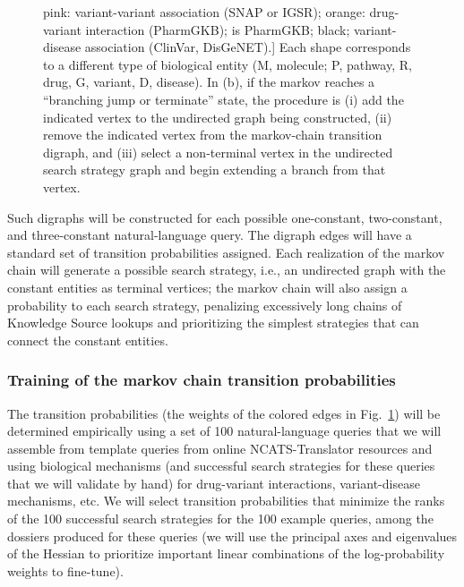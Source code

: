 \documentclass[11pt,notitlepage]{article}
\begin{document}
\begin{figure}[h!]
{      pink: variant-variant association (SNAP or IGSR); orange: drug-variant
      interaction (PharmGKB); is PharmGKB; black; variant-disease association
      (ClinVar, DisGeNET).] Each shape corresponds to a different type of
    biological entity (M, molecule; P, pathway, R, drug, G, variant, D,
    disease). In (b), if the markov reaches a ``branching jump or terminate''
    state, the procedure is (i) add the indicated vertex to the undirected graph
    being constructed, (ii) remove the indicated vertex from the markov-chain
    transition digraph, and (iii) select a non-terminal vertex in the undirected
    search strategy graph and begin extending a branch from that vertex.}
  \label{fig:mp}    
\end{figure}
Such digraphs will be constructed for each possible one-constant, two-constant,
and three-constant natural-language query. The digraph edges will have a
standard set of transition probabilities assigned. Each realization of the
markov chain will generate a possible search strategy, i.e., an undirected graph
with the constant entities as terminal vertices; the markov chain will also
assign a probability to each search strategy, penalizing excessively long chains
of Knowledge Source lookups and prioritizing the simplest strategies that can
connect the constant entities.

\subsubsection{Training of the markov chain transition probabilities}
The transition probabilities (the weights of the
colored edges in Fig.~\ref{fig:mp}) will be determined empirically using a set
of 100 natural-language queries that we will assemble from template queries from
online NCATS-Translator resources and using biological mechanisms (and
successful search strategies for these queries that we will validate by hand)
for drug-variant interactions, variant-disease mechanisms, etc. We will select
transition probabilities that minimize the ranks of the 100 successful search
strategies for the 100 example queries, among the dossiers produced for these
queries (we will use the principal axes and eigenvalues of the Hessian to
prioritize important linear combinations of the log-probability weights to
fine-tune).
\end{document}
